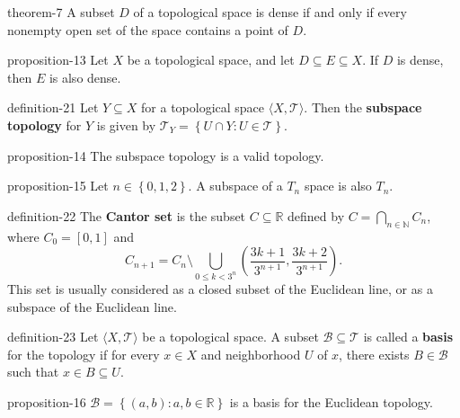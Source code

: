 \documentclass[10pt,]{article}
\newcommand{\terminology}[1]{\textbf{#1}}
\newcommand{\tuple}[1]{\langle #1 \rangle}
\newcommand{\mb}{\mathbb}
\newcommand{\mc}{\mathcal}
\newcommand{\setBuilder}[2]{\left\{#1:#2\right\}}
\newcommand{\setList}[1]{\left\{#1\right\}}
\newcommand{\lt}{<}
\begin{document}
\begin{theorem}{}{}{theorem-7}%
\hypertarget{p-67}{}%
A subset \(D\) of a topological space is dense if and only if every nonempty open set of the space contains a point of \(D\).%
\end{theorem}
\begin{proposition}{}{}{proposition-13}%
\hypertarget{p-68}{}%
Let \(X\) be a topological space, and let \(D\subseteq E\subseteq X\). If \(D\) is dense, then \(E\) is also dense.%
\end{proposition}
\begin{definition}{}{definition-21}%
\hypertarget{p-69}{}%
Let \(Y\subseteq X\) for a topological space \(\tuple{X,\mc T}\). Then the \terminology{subspace topology} for \(Y\) is given by \(\mc T_Y=\setBuilder{U\cap Y}{U\in\mc T}\).%
\end{definition}
\begin{proposition}{}{}{proposition-14}%
\hypertarget{p-70}{}%
The subspace topology is a valid topology.%
\end{proposition}
\begin{proposition}{}{}{proposition-15}%
\hypertarget{p-71}{}%
Let \(n\in\setList{0,1,2}\). A subspace of a \(T_n\) space is also \(T_n\).%
\end{proposition}
\begin{definition}{}{definition-22}%
\hypertarget{p-72}{}%
The \terminology{Cantor set} is the subset \(C\subseteq\mb R\) defined by \(C=\bigcap_{n\in\mb N} C_n\), where \(C_0=[0,1]\) and%
\begin{equation*}
C_{n+1}=C_n\setminus\bigcup_{0\leq k\lt 3^n} 
\left(\frac{3k+1}{3^{n+1}},\frac{3k+2}{3^{n+1}}\right).
\end{equation*}
This set is usually considered as a closed subset of the Euclidean line, or as a subspace of the Euclidean line.%
\end{definition}
\begin{definition}{}{definition-23}%
\hypertarget{p-73}{}%
Let \(\tuple{X,\mc T}\) be a topological space. A subset \(\mc B\subseteq\mc T\) is called a \terminology{basis} for the topology if for every \(x\in X\) and neighborhood \(U\) of \(x\), there exists \(B\in\mc B\) such that \(x\in B\subseteq U\).%
\end{definition}
\begin{proposition}{}{}{proposition-16}%
\hypertarget{p-74}{}%
\(\mc B=\setBuilder{(a,b)}{a,b\in\mb R}\) is a basis for the Euclidean topology.%
\end{proposition}
\end{document}
